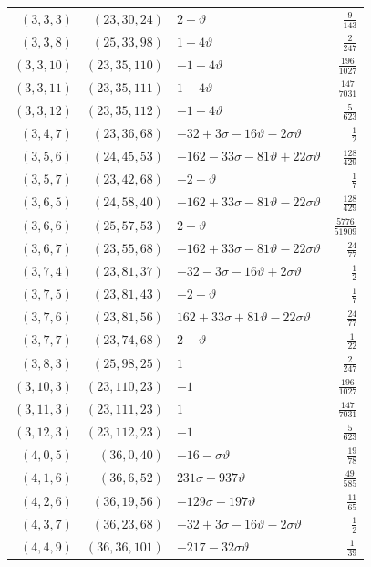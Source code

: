 \begin{longtable}{rrlr}
$(3,3,3)$ & $(23,30,24)$ & $2+\vartheta$ & $\frac{9}{143}$\\
$(3,3,8)$ & $(25,33,98)$ & $1+4\vartheta$ & $\frac{2}{247}$\\
$(3,3,10)$ & $(23,35,110)$ & $-1-4\vartheta$ & $\frac{196}{1027}$\\
$(3,3,11)$ & $(23,35,111)$ & $1+4\vartheta$ & $\frac{147}{7031}$\\
$(3,3,12)$ & $(23,35,112)$ & $-1-4\vartheta$ & $\frac{5}{623}$\\
$(3,4,7)$ & $(23,36,68)$ & $-32+3\sigma-16\vartheta-2\sigma\vartheta$ & $\frac{1}{2}$\\
$(3,5,6)$ & $(24,45,53)$ & $-162-33\sigma-81\vartheta+22\sigma\vartheta$ & $\frac{128}{429}$\\
$(3,5,7)$ & $(23,42,68)$ & $-2-\vartheta$ & $\frac{1}{7}$\\
$(3,6,5)$ & $(24,58,40)$ & $-162+33\sigma-81\vartheta-22\sigma\vartheta$ & $\frac{128}{429}$\\
$(3,6,6)$ & $(25,57,53)$ & $2+\vartheta$ & $\frac{5776}{51909}$\\
$(3,6,7)$ & $(23,55,68)$ & $-162+33\sigma-81\vartheta-22\sigma\vartheta$ & $\frac{24}{77}$\\
$(3,7,4)$ & $(23,81,37)$ & $-32-3\sigma-16\vartheta+2\sigma\vartheta$ & $\frac{1}{2}$\\
$(3,7,5)$ & $(23,81,43)$ & $-2-\vartheta$ & $\frac{1}{7}$\\
$(3,7,6)$ & $(23,81,56)$ & $162+33\sigma+81\vartheta-22\sigma\vartheta$ & $\frac{24}{77}$\\
$(3,7,7)$ & $(23,74,68)$ & $2+\vartheta$ & $\frac{1}{22}$\\
$(3,8,3)$ & $(25,98,25)$ & $1$ & $\frac{2}{247}$\\
$(3,10,3)$ & $(23,110,23)$ & $-1$ & $\frac{196}{1027}$\\
$(3,11,3)$ & $(23,111,23)$ & $1$ & $\frac{147}{7031}$\\
$(3,12,3)$ & $(23,112,23)$ & $-1$ & $\frac{5}{623}$\\
$(4,0,5)$ & $(36,0,40)$ & $-16-\sigma\vartheta$ & $\frac{19}{78}$\\
$(4,1,6)$ & $(36,6,52)$ & $231\sigma-937\vartheta$ & $\frac{49}{585}$\\
$(4,2,6)$ & $(36,19,56)$ & $-129\sigma-197\vartheta$ & $\frac{11}{65}$\\
$(4,3,7)$ & $(36,23,68)$ & $-32+3\sigma-16\vartheta-2\sigma\vartheta$ & $\frac{1}{2}$\\
$(4,4,9)$ & $(36,36,101)$ & $-217-32\sigma\vartheta$ & $\frac{1}{39}$\\

\end{longtable}
